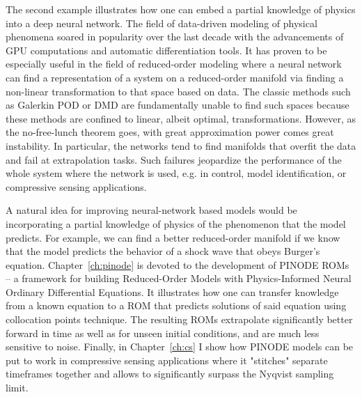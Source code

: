 The second example illustrates how one can embed a partial knowledge of physics into a deep neural network. The field of data-driven modeling of physical phenomena soared in popularity over the last decade with the advancements of GPU computations and automatic differentiation tools. It has proven to be especially useful in the field of reduced-order modeling where a neural network can find a representation of a system on a reduced-order manifold via finding a non-linear transformation to that space based on data. The classic methods such as Galerkin POD or DMD are fundamentally unable to find such spaces because these methods are confined to linear, albeit optimal, transformations. However, as the no-free-lunch theorem goes, with great approximation power comes great instability. In particular, the networks tend to find manifolds that overfit the data and fail at extrapolation tasks. Such failures jeopardize the performance of the whole system where the network is used, e.g. in control, model identification, or compressive sensing applications.

A natural idea for improving neural-network based models would be incorporating a partial knowledge of physics of the phenomenon that the model predicts. For example,  we can find a better reduced-order manifold if we know that the model predicts the behavior of a shock wave that obeys Burger's equation. Chapter~\ref{ch:pinode} is devoted to the development of PINODE ROMs -- a framework for building Reduced-Order Models with Physics-Informed Neural Ordinary Differential Equations. It illustrates how one can transfer knowledge from a known equation to a ROM that predicts solutions of said equation using collocation points technique. The resulting ROMs extrapolate significantly better forward in time as well as for unseen initial conditions, and are much less sensitive to noise. Finally, in Chapter~\ref{ch:cs} I show how PINODE models can be put to work in compressive sensing applications where it "stitches" separate timeframes together and allows to significantly surpass the Nyqvist sampling limit.

